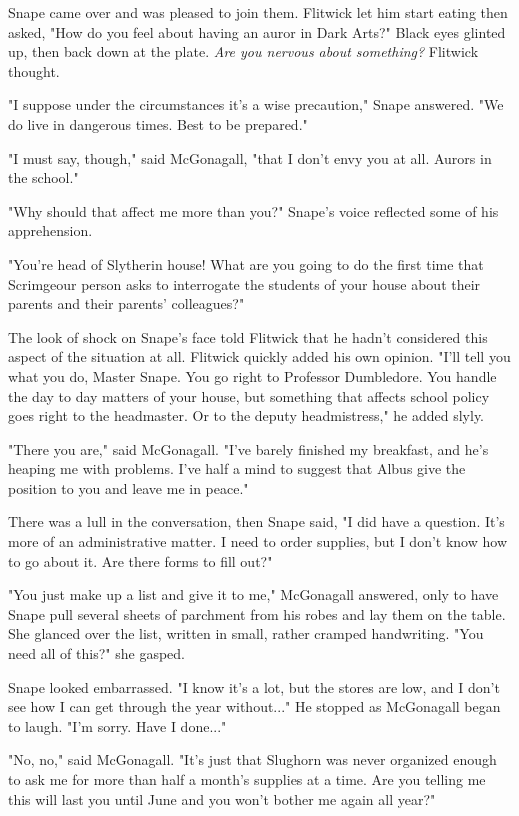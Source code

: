 \documentclass[a4paper,11pt]{article}
\begin{document}
Snape came over and was pleased to join them. Flitwick let him start eating then asked, "How do you feel about having an auror in Dark Arts?" Black eyes glinted up, then back down at the plate. \emph{Are you nervous about something?} Flitwick thought.

"I suppose under the circumstances it's a wise precaution," Snape answered. "We do live in dangerous times. Best to be prepared."

"I must say, though," said McGonagall, "that I don't envy you at all. Aurors in the school."

"Why should that affect me more than you?" Snape's voice reflected some of his apprehension.

"You're head of Slytherin house! What are you going to do the first time that Scrimgeour person asks to interrogate the students of your house about their parents and their parents' colleagues?"

The look of shock on Snape's face told Flitwick that he hadn't considered this aspect of the situation at all. Flitwick quickly added his own opinion. "I'll tell you what you do, Master Snape. You go right to Professor Dumbledore. You handle the day to day matters of your house, but something that affects school policy goes right to the headmaster. Or to the deputy headmistress," he added slyly.

"There you are," said McGonagall. "I've barely finished my breakfast, and he's heaping me with problems. I've half a mind to suggest that Albus give the position to you and leave me in peace."

There was a lull in the conversation, then Snape said, "I did have a question. It's more of an administrative matter. I need to order supplies, but I don't know how to go about it. Are there forms to fill out?"

"You just make up a list and give it to me," McGonagall answered, only to have Snape pull several sheets of parchment from his robes and lay them on the table. She glanced over the list, written in small, rather cramped handwriting. "You need all of this?" she gasped.

Snape looked embarrassed. "I know it's a lot, but the stores are low, and I don't see how I can get through the year without..." He stopped as McGonagall began to laugh. "I'm sorry. Have I done..."

"No, no," said McGonagall. "It's just that Slughorn was never organized enough to ask me for more than half a month's supplies at a time. Are you telling me this will last you until June and you won't bother me again all year?"
\end{document}
